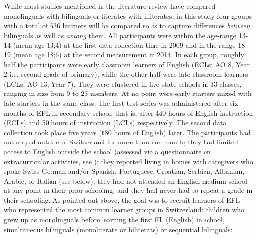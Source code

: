 \documentclass[output=paper,modfonts,nonflat,newtxmath]{langsci/langscibook}
\begin{document}
While most studies mentioned in the literature review have compared monolinguals with bilinguals or literates with illiterates, in this study four groups with a total of 636 learners will be compared so as to capture differences \textit{between} bilinguals as well as \textit{among} them. All participants were within the age-range 13-14 (mean age 13;4) at the first data collection time in 2009 and in the range 18-19 (mean age 18;6) at the second measurement in 2014. In each group, roughly half the participants were early classroom learners of English (ECLs; AO 8, Year 2 i.e. second grade of primary), while the other half were late classroom learners (LCLs; AO 13, Year 7). They were clustered in five state schools in 33 classes, ranging in size from 9 to 23 members. At no point were early starters mixed with late starters in the same class. The first test series was administered after six months of EFL in secondary school, that is, after 440 hours of English instruction (ECLs) and 50 hours of instruction (LCLs) respectively. The second data collection took place five years (680 hours of English) later. The participants had not stayed outside of Switzerland for more than one month; they had limited access to English outside the school (assessed via a questionnaire on extracurricular activities, see \citealt{PfenningerSingleton2017}); they reported living in homes with caregivers who spoke Swiss German and/or Spanish, Portuguese, Croatian, Serbian, Albanian, Arabic, or Italian (see below); they had not attended an English-medium school at any point in their prior schooling,  and they had never had to repeat a grade in their schooling. As pointed out above, the goal was to recruit learners of EFL who represented the most common learner groups in Switzerland: children who grew up as monolinguals before learning the first FL (English) in school, simultaneous bilinguals (monoliterate or biliterate) or sequential bilinguals:
\end{document}

